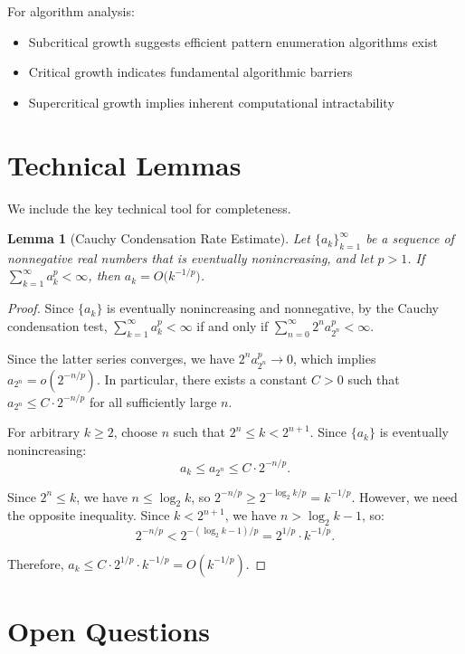 \documentclass[11pt]{article}
\newtheorem{lemma}[theorem]{Lemma}
\theoremstyle{definition}
\begin{document}
For algorithm analysis:
\begin{itemize}
\item Subcritical growth suggests efficient pattern enumeration algorithms exist
\item Critical growth indicates fundamental algorithmic barriers
\item Supercritical growth implies inherent computational intractability
\end{itemize}

\section{Technical Lemmas}

We include the key technical tool for completeness.

\begin{lemma}[Cauchy Condensation Rate Estimate]\label{lem:dyadic}
Let $\{a_k\}_{k=1}^\infty$ be a sequence of nonnegative real numbers that is eventually nonincreasing, and let $p>1$. If $\sum_{k=1}^\infty a_k^{p}<\infty$, then $a_k=O\big(k^{-1/p}\big)$.
\end{lemma}

\begin{proof}
Since $\{a_k\}$ is eventually nonincreasing and nonnegative, by the Cauchy condensation test, $\sum_{k=1}^\infty a_k^p < \infty$ if and only if $\sum_{n=0}^\infty 2^n a_{2^n}^p < \infty$.

Since the latter series converges, we have $2^n a_{2^n}^p \to 0$, which implies $a_{2^n} = o(2^{-n/p})$. In particular, there exists a constant $C > 0$ such that $a_{2^n} \leq C \cdot 2^{-n/p}$ for all sufficiently large $n$.

For arbitrary $k \geq 2$, choose $n$ such that $2^n \leq k < 2^{n+1}$. Since $\{a_k\}$ is eventually nonincreasing:
$$a_k \leq a_{2^n} \leq C \cdot 2^{-n/p}.$$

Since $2^n \leq k$, we have $n \leq \log_2 k$, so $2^{-n/p} \geq 2^{-\log_2 k/p} = k^{-1/p}$. However, we need the opposite inequality. Since $k < 2^{n+1}$, we have $n > \log_2 k - 1$, so:
$$2^{-n/p} < 2^{-(\log_2 k - 1)/p} = 2^{1/p} \cdot k^{-1/p}.$$

Therefore, $a_k \leq C \cdot 2^{1/p} \cdot k^{-1/p} = O(k^{-1/p})$.
\end{proof}

\section{Open Questions}
\end{document}
